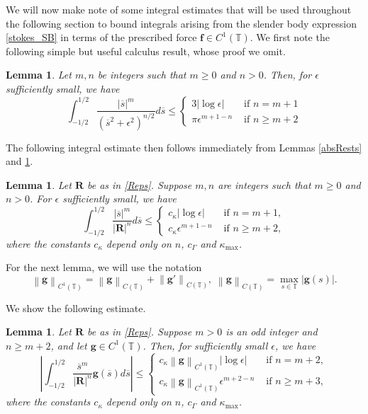 \documentclass[11pt]{article}
\numberwithin{equation}{section}
\newcommand{\T}{\mathbb{T}}
\newcommand{\bars}{\overline s}
\newcommand{\abs}[1]{\left\lvert #1 \right\rvert}
\newcommand{\norm}[1]{\left\lVert #1 \right\rVert}
\newtheorem{lemma}[theorem]{Lemma}
\theoremstyle{definition}
\begin{document}
We will now make note of some integral estimates that will be used throughout the following section to bound integrals arising from the slender body expression \eqref{stokes_SB} in terms of the prescribed force $\bm{f}\in C^1(\T)$. We first note the following simple but useful calculus result, whose proof we omit. 
\begin{lemma}\label{defints}
Let $m,n$ be integers such that $m\geq 0$ and $n>0$. Then, for $\epsilon$ sufficiently small, we have
\begin{equation}
\int_{-1/2}^{1/2}\frac{\abs{\bars}^{m}}{(\bars^2+\epsilon^2)^{n/2}}d\bars \le 
\begin{cases}
3\abs{\log \epsilon}&\text{ if } n=m+1\\
\pi \epsilon^{m+1-n} &\text{ if } n\geq m+2
\end{cases}
\end{equation}
\end{lemma}

The following integral estimate then follows immediately from Lemmas \ref{absRests} and \ref{defints}. 
\begin{lemma}\label{Rintest0}
Let $\bm{R}$ be as in \eqref{Reps}. Suppose $m,n$ are integers such that $m\geq 0$ and $n>0$. For $\epsilon$ sufficiently small, we have
\begin{equation}
\int_{-1/2}^{1/2} \frac{\abs{\bars}^{m}}{\abs{\bm{R}}^n}d\bars \le 
\begin{cases}
c_\kappa\abs{\log \epsilon} &\text{ if } n=m+1,\\
c_\kappa \epsilon^{m+1-n} &\text{ if } n\ge m+2,
\end{cases}
\end{equation}
where the constants $c_\kappa$ depend only on $n$, $c_\Gamma$ and $\kappa_{\max}$.
\end{lemma}

For the next lemma, we will use the notation 
\begin{equation}
\norm{\bm{g}}_{C^1(\T)}=\norm{\bm{g}}_{C(\T)}+\norm{\bm{g}'}_{C(\T)}, \; 
\norm{\bm{g}}_{C(\T)}=\max_{s\in \T}\abs{\bm{g}(s)}.
\end{equation}

We show the following estimate.
\begin{lemma}\label{Rintest1}
Let $\bm{R}$ be as in \eqref{Reps}. Suppose $m>0$ is an odd integer and $n\ge m+2$, and 
let $\bm{g}\in C^1(\T)$. Then, for sufficiently small $\epsilon$, we have
\begin{equation}\label{Intest_ineq}
\abs{\int^{1/2}_{-1/2}\frac{\bars^m}{\abs{\bm{R}}^n}\bm{g}(\bars)d\bars} \le \begin{cases}
c_\kappa \norm{\bm{g}}_{C^1(\T)}\abs{\log \epsilon} &\text{ if } n=m+2,\\
c_\kappa \norm{\bm{g}}_{C^1(\T)}\epsilon^{m+2-n} &\text{ if } n\ge m+3,
\end{cases}
\end{equation}
where the constants $c_\kappa$ depend only on $n$, $c_\Gamma$ and $\kappa_{\max}$.
\end{lemma}
\end{document}

